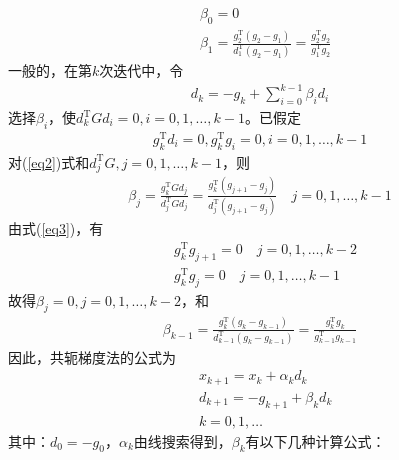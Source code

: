             \begin{align*}
            &{\beta}_0=0\\
            &{\beta}_1=\frac {g_2^\mathrm{T} (g_2-g_1)}{d_1^\mathrm{T} (g_2-g_1)}= \frac {g_2^\mathrm{T} g_2}{g_1^\mathrm{T} g_2}
            \end{align*}
            一般的，在第$k$次迭代中，令
            \begin{align}
            \label{eq2}
            d_k=-g_k+\mathop {\sum} \limits_{i=0}^{k-1}{\beta}_id_i
            \end{align}
            选择${\beta}_i$，使$d_k^\mathrm{T} Gd_i=0,i=0,1,\ldots,k-1$。已假定
            \begin{align}
            \label{eq3}
            g_k^\mathrm{T} d_i=0,g_k^\mathrm{T} g_i=0,i=0,1,\ldots,k-1
            \end{align}
            对(\ref{eq2})式和$d_j^\mathrm{T} G,j=0,1,\ldots,k-1$，则
            \begin{align*}
            {\beta}_j=\frac {g_k^\mathrm{T} Gd_j}{d_j^\mathrm{T} Gd_j}= \frac {g_k^\mathrm{T} (g_{j+1}-g_j)}{d_j^\mathrm{T} (g_{j+1}-g_j)}\quad j=0,1,\ldots,k-1
            \end{align*}
            由式(\ref{eq3})，有
            \begin{align*}
            &g_k^\mathrm{T} g_{j+1}=0\quad j=0,1,\ldots,k-2\\
            &g_k^\mathrm{T} g_{j}=0\quad j=0,1,\ldots,k-1
            \end{align*}
            故得${\beta}_j=0,j=0,1,\ldots,k-2$，和
            \begin{align*}
            {\beta}_{k-1}=\frac {g_k^\mathrm{T} (g_{k}-g_{k-1})}{d_{k-1}^\mathrm{T} (g_{k}-g_{k-1})}= \frac {g_k^\mathrm{T} g_k}{g_{k -1}^\mathrm{T} g_{k -1}}
            \end{align*}
            因此，共轭梯度法的公式为
            \begin{align*}
            &x_{k+1}=x_k+{\alpha}_kd_k\\
            &d_{k+1}=-g_{k+1}+{\beta}_kd_k\\
            &k = 0,1,\ldots
            \end{align*}
            其中：$d_0=-g_0$，${\alpha}_k$由线搜索得到，${\beta}_k$有以下几种计算公式：

